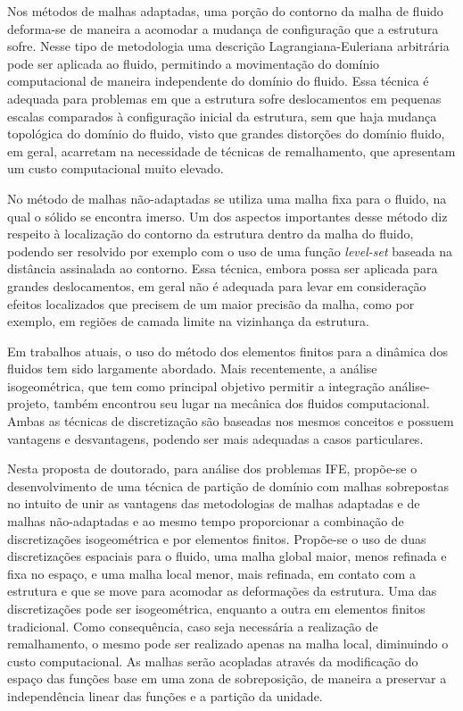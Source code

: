 \documentclass[tese_patricia.tex]{subfiles}
\begin{document}
Nos métodos de malhas adaptadas, uma porção do contorno da malha de fluido deforma-se de maneira a acomodar a mudança de configuração que a estrutura sofre. Nesse tipo de metodologia uma descrição Lagrangiana-Euleriana arbitrária pode ser aplicada ao fluido, permitindo a movimentação do domínio computacional de maneira independente do domínio do fluido. Essa técnica é adequada para problemas em que a estrutura sofre deslocamentos em pequenas escalas comparados à configuração inicial da estrutura, sem que haja mudança topológica do domínio do fluido, visto que grandes distorções do domínio fluido, em geral, acarretam na necessidade de técnicas de remalhamento, que apresentam um custo computacional muito elevado.

No método de malhas não-adaptadas se utiliza uma malha fixa para o fluido, na qual o sólido se encontra imerso. Um dos aspectos importantes desse método diz respeito à localização do contorno da estrutura dentro da malha do fluido, podendo ser resolvido por exemplo com o uso de uma função \textit{level-set} baseada na distância assinalada ao contorno. Essa técnica, embora possa ser aplicada para grandes deslocamentos, em geral não é adequada para levar em consideração efeitos localizados que precisem de um maior precisão da malha, como por exemplo, em regiões de camada limite na vizinhança da estrutura. 

Em trabalhos atuais, o uso do método dos elementos finitos para a dinâmica dos fluidos tem sido largamente abordado. Mais recentemente, a análise isogeométrica, que tem como principal objetivo permitir a integração análise-projeto, também encontrou seu lugar na mecânica dos fluidos computacional. Ambas as técnicas de discretização são baseadas nos mesmos conceitos e possuem vantagens e desvantagens, podendo ser mais adequadas a casos particulares.

Nesta proposta de doutorado, para análise dos problemas IFE, propõe-se o desenvolvimento de uma técnica de partição de domínio com malhas sobrepostas no intuito de unir as vantagens das metodologias de malhas adaptadas e de malhas não-adaptadas e ao mesmo tempo proporcionar a combinação de discretizações isogeométrica e por elementos finitos. Propõe-se o uso de duas discretizações espaciais para o fluido, uma malha global maior, menos refinada e fixa no espaço, e uma malha local menor, mais refinada, em contato com a estrutura e que se move para acomodar as deformações da estrutura. Uma das discretizações pode ser isogeométrica, enquanto a outra em elementos finitos tradicional. Como consequência, caso seja necessária a realização de remalhamento, o mesmo pode ser realizado apenas na malha local, diminuindo o custo computacional. As malhas serão acopladas através da modificação do espaço das funções base em uma zona de sobreposição, de maneira a preservar a independência linear das funções e a partição da unidade. 
\end{document}
